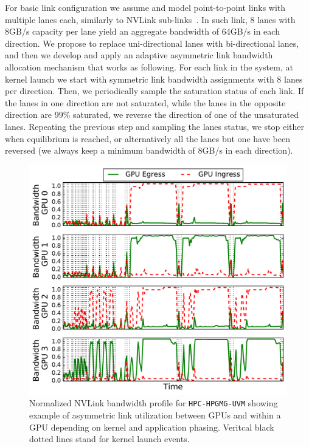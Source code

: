 For basic link configuration we assume and model point-to-point links with
multiple lanes each, similarly to NVLink sub-links~\cite{pascal-tesla-wp}. In
such link, 8 lanes with 8GB/s capacity per lane yield an aggregate bandwidth of
64GB/s in each direction. We propose to replace uni-directional lanes with
bi-directional lanes, and then we develop and apply an adaptive asymmetric link
bandwidth allocation mechanism that works as following. For each link in the
system, at kernel launch we start with symmetric link bandwidth assignments
with 8 lanes per direction. Then, we periodically sample the saturation status
of each link. If the lanes in one direction are not saturated, while the lanes
in the opposite direction are 99\% saturated, we reverse the direction of one
of the unsaturated lanes. Repeating the previous step and sampling the lanes
status, we stop either when equilibrium is reached, or alternatively all the
lanes but one have been reversed (we always keep a minimum bandwidth of 8GB/s
in each direction).  

\begin{figure}[t]
    \centering
    
\includegraphics[width=1.0\columnwidth]{figures/bw_profile_HPGMG_UVM_base.pdf}
    \caption{Normalized NVLink bandwidth profile for \texttt{HPC-HPGMG-UVM} 
showing example of asymmetric link utilization between GPUs and within a GPU depending on kernel and application phasing. Veritcal black dotted lines stand for kernel launch events.}
    \label{fig:link-motivation}
    \vspace{-.2in}
\end{figure}

